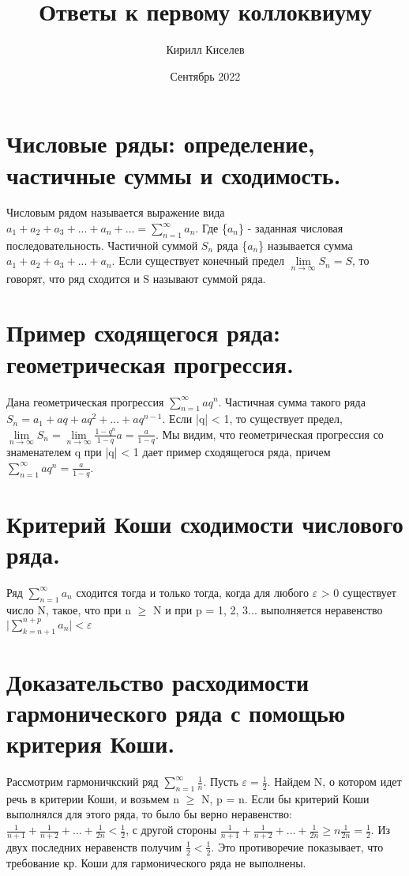 \documentclass[12pt, a4paper]{article}
\title{Ответы к первому коллоквиуму}
\author{Кирилл Киселев}
\date{Сентябрь 2022}
\begin{document}
\maketitle
\newpage
\section{Числовые ряды: определение, частичные суммы и сходимость.}
Числовым рядом называется выражение вида $a_1 + a_2 + a_3 + ...+ a_n + \ldots =  \sum\limits_{n=1}^{\infty}a_{n}$. Где \{$a_n$\} - заданная числовая последовательность.
Частичной суммой $S_{n}$ ряда \{$a_{n}$\}  называется сумма $a_{1} + a_{2} + a_{3} + ... + a_{n}$. Если существует конечный предел $\lim\limits_{n \to \infty} S_{n} = S$, то говорят, что ряд сходится и S называют суммой ряда.
\section{Пример сходящегося ряда: геометрическая прогрессия.}
Дана геометрическая прогрессия $\sum\limits_{n=1}^{\infty}aq^n$. Частичная сумма такого ряда $S_n = a_1 + aq + aq^2 + ... + aq^{n-1}$. Если |q| < 1, то существует предел, $\lim\limits_{n \to \infty}S_n = \lim\limits_{n \to \infty}\frac{1 - q^n}{1 - q}a = \frac{a}{1 - q}$. Мы видим, что геометрическая прогрессия со знаменателем q при |q| < 1 дает пример сходящегося ряда, причем  $\sum_{n=1}^{\infty}aq^n = \frac{a}{1 - q}$.

\section{Критерий Коши сходимости числового ряда.}
Ряд  $\sum\limits_{n=1}^{\infty}a_n$ сходится тогда и только тогда, когда для любого $\varepsilon$ > 0 существует число N, такое, что при n $\geq$ N и при p = 1, 2, 3... выполняется неравенство $\mid  \sum\limits_{k=n+1}^{n + p}a_n \mid < \varepsilon$ 

\section{Доказательство расходимости гармонического ряда с помощью критерия Коши.}
Рассмотрим гармоничкский ряд $\sum\limits_{n=1}^{\infty}\frac{1}{n}$. Пусть $\varepsilon = \frac{1}{2}$. Найдем N, о котором идет речь в критерии Коши, и возьмем n $\geq$ N, p = n. Если бы критерий Коши выполнялся для этого ряда, то было бы верно неравенство: $\frac{1}{n + 1} + \frac{1}{n + 2} + ... + \frac{1}{2n} < \frac{1}{2}$, с другой стороны $\frac{1}{n + 1} + \frac{1}{n + 2} + ... + \frac{1}{2n} \geq n\frac{1}{2n} = \frac{1}{2}$. Из двух последних неравенств получим $\frac{1}{2} < \frac{1}{2}$. Это противоречие показывает, что требование кр. Коши для гармонического ряда не выполнены.
\end{document}
